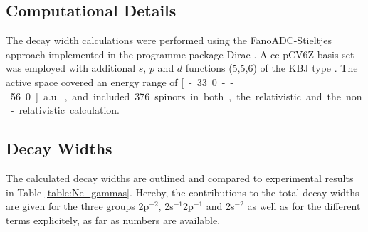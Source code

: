 \subsection{Computational Details}
The decay width calculations were performed using the FanoADC-Stieltjes approach
implemented in the programme package Dirac \cite{DIRAC13}.
A cc-pCV6Z basis set was employed with
additional $s$, $p$ and $d$ functions (5,5,6) of the \ac{KBJ} type \cite{Kaufmann89}.
The active space covered an energy range of \unit[-33.0 -- 56.0]{a.u.}, and included
376 spinors in both, the relativistic and the non-relativistic calculation.

\subsection{Decay Widths}
The calculated decay widths are outlined and compared to experimental
results in Table \ref{table:Ne_gammas}. Hereby, the contributions to the
total decay widths are given
for the three groups 2p$^{-2}$, 2s$^{-1}$2p$^{-1}$ and 2s$^{-2}$ as well
as for the different terms explicitely, as far as numbers are available.

